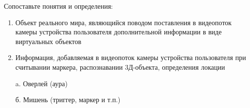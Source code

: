 
Сопоставьте понятия и определения:

        \begin{enumerate}
            \item Объект реального мира, являющийся поводом поставления в видеопоток камеры устройства пользователя дополнительной информации в виде виртуальных объектов
            \item Информация, добавляемая в видеопоток камеры устройства пользователя при считывании маркера, распознавании 3Д-объекта, определения локации
        \end{enumerate}

        \begin{enumerate}
            \item[a.] Оверлей (аура)
            \item[б.] Мишень (триггер, маркер и т.п.)
        \end{enumerate}